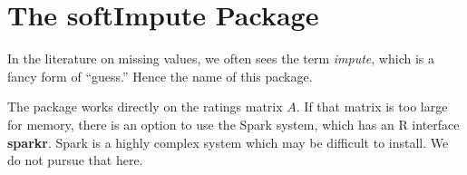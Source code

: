 \section{The softImpute Package}

In the literature on missing values, we often sees the term
\textit{impute}, which is a fancy form of ``guess.''  Hence the name of
this package.

The package works directly on the ratings matrix $A$.  If that matrix is
too large for memory, there is an option to use the Spark system, which
has an R interface \textbf{sparkr}.  Spark is a highly complex system
which may be difficult to install.  We do not pursue that here.
